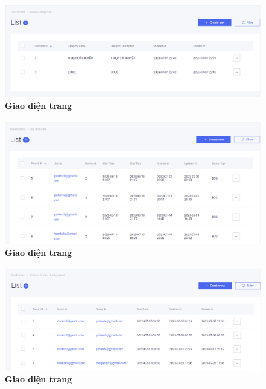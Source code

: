 \begin{figure}[H]
  \centering
  \includegraphics[scale=0.5]{Images/server/webUI/news_category_list.PNG}
  \caption[Giao diện trang]{\bfseries \fontsize{12pt}{0pt}\selectfont Giao diện trang}
  \label{demo_} %
\end{figure}


\begin{figure}[H]
  \centering
  \includegraphics[scale=0.5]{Images/server/webUI/ecg_record_list.PNG}
  \caption[Giao diện trang]{\bfseries \fontsize{12pt}{0pt}\selectfont Giao diện trang}
  \label{demo_} %
\end{figure}


\begin{figure}[H]
  \centering
  \includegraphics[scale=0.5]{Images/server/webUI/pat_doc_list.PNG}
  \caption[Giao diện trang]{\bfseries \fontsize{12pt}{0pt}\selectfont Giao diện trang}
  \label{demo_} %
\end{figure}

